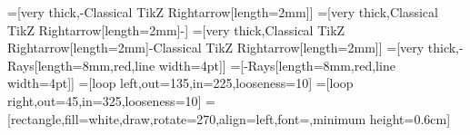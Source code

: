 \usepackage[utf8]{inputenc}
\usepackage[english]{babel}
\usepackage[hyphens]{url}
\usepackage{doi}
\usepackage{hyperref}
\usepackage{amsmath}
\usepackage{amssymb}
\usepackage{amsthm}
\usepackage{tikz}
\usepackage{tikzpeople} %
\usepackage{natbib}
\usepackage{fancyhdr} %
\usepackage{textcomp} %
\usepackage{algorithm}
\usepackage{algpseudocode} %
\usepackage{mdframed}
\usepackage{lipsum}

\usepackage{minted}

\usetikzlibrary{arrows.meta}
\usetikzlibrary{shapes.multipart}
\usetikzlibrary{shapes.callouts}
=[very thick,-{Classical TikZ Rightarrow[length=2mm]}]
=[very thick,{Classical TikZ Rightarrow[length=2mm]}-]
=[very thick,{Classical TikZ Rightarrow[length=2mm]}-{Classical TikZ Rightarrow[length=2mm]}]
=[very thick,-{Rays[length=8mm,red,line width=4pt]}]
=[-{Rays[length=8mm,red,line width=4pt]}]
=[loop left,out=135,in=225,looseness=10]
=[loop right,out=45,in=325,looseness=10]
=[rectangle,fill=white,draw,rotate=270,align=left,font=\footnotesize,minimum height=0.6cm]


\newcommand{\inlineslide}[2]{
    \refstepcounter{inlineslides}
    \pagebreak[3]\vspace{1em}\noindent
    \fbox{
      \begin{minipage}{9cm}
        \begin{center}
          \includeslide[width=9cm,page=0]{#1} \\
        \end{center}
      \end{minipage}
    }
    \hfill
    \begin{minipage}{6cm}
        \vbox to 5.5cm {\raggedright{#2}\vfil}%
        \vspace{1cm}%
        \textsf{Slide \theinlineslides}%
    \end{minipage}
    \par\vspace{1em}\pagebreak[3]
}
\def\inlineslidesautorefname{Slide}%

